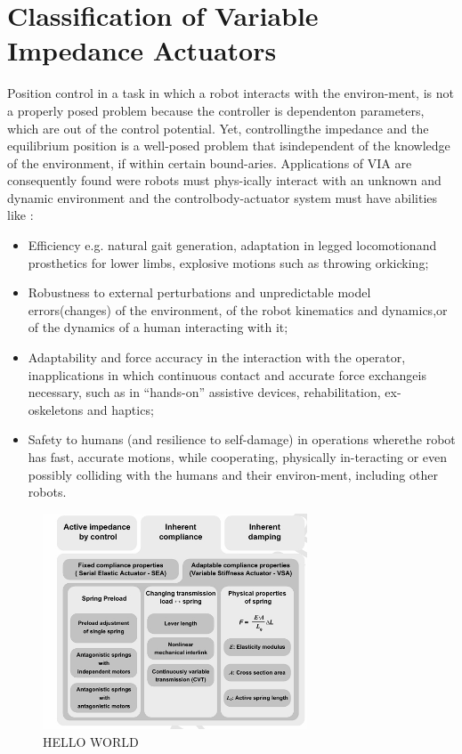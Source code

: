 \documentclass[12pt,a4paper]{article}
\begin{document}
    \section{Classification of Variable Impedance Actuators}
    Position control in a task in which a robot interacts with the environ-ment, is not a properly posed problem because the controller is dependenton parameters, which are out of the control potential. Yet, controllingthe impedance and the equilibrium position is a well-posed problem that isindependent of the knowledge of the environment, if within certain bound-aries. Applications of VIA are consequently found were robots must phys-ically interact with an unknown and dynamic environment and the controlbody-actuator system must have abilities like :
    \begin{itemize}
        \item Efficiency e.g. natural gait generation, adaptation in legged locomotionand prosthetics for lower limbs, explosive motions such as throwing orkicking;
        \item Robustness to external perturbations and unpredictable model errors(changes) of the environment, of the robot kinematics and dynamics,or of the dynamics of a human interacting with it;
        \item Adaptability and force accuracy in the interaction with the operator, inapplications in which continuous contact and accurate force exchangeis necessary, such as in “hands-on” assistive devices, rehabilitation, ex-oskeletons and haptics;
        \item Safety to humans (and resilience to self-damage) in operations wherethe robot has fast, accurate motions, while cooperating, physically in-teracting or even possibly colliding with the humans and their environ-ment, including other robots.
    \end{itemize}
    \begin{figure}[ht]
        \centering
        \includegraphics[width=0.7\textwidth]{figures/fig1.png}
        \caption{HELLO WORLD}\label{fig:HELLO_WORLD}
    \end{figure}
\end{document}

